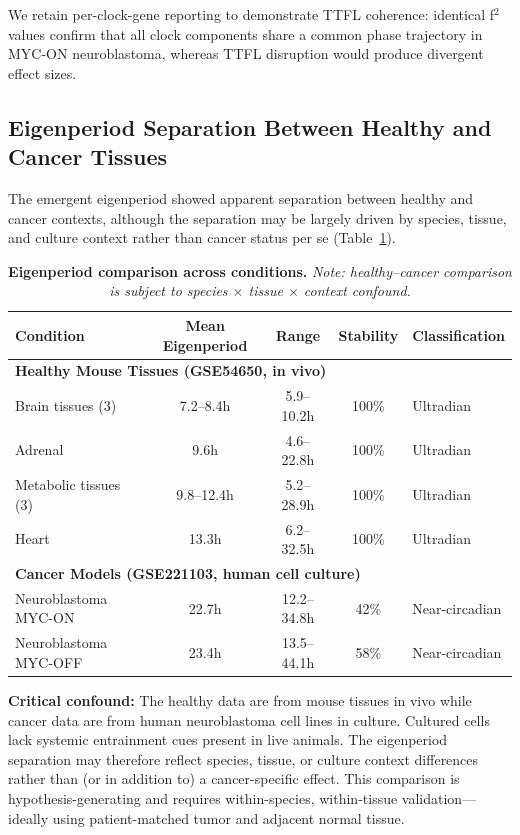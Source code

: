 \documentclass[11pt,letterpaper]{article}
\begin{document}
We retain per-clock-gene reporting to demonstrate TTFL coherence: identical f$^2$ values confirm that all clock components share a common phase trajectory in MYC-ON neuroblastoma, whereas TTFL disruption would produce divergent effect sizes.

\subsection{Eigenperiod Separation Between Healthy and Cancer Tissues}

The emergent eigenperiod showed apparent separation between healthy and cancer contexts, although the separation may be largely driven by species, tissue, and culture context rather than cancer status per se (Table~\ref{tab:eigenperiod}).

\begin{table}[H]
\centering
\caption{\textbf{Eigenperiod comparison across conditions.} \textit{Note: healthy--cancer comparison is subject to species $\times$ tissue $\times$ context confound.}}
\label{tab:eigenperiod}
\begin{tabular}{lcccl}
\toprule
Condition & Mean Eigenperiod & Range & Stability & Classification \\
\midrule
\multicolumn{5}{l}{\textbf{Healthy Mouse Tissues (GSE54650, in vivo)}} \\
Brain tissues (3) & 7.2--8.4h & 5.9--10.2h & 100\% & Ultradian \\
Adrenal & 9.6h & 4.6--22.8h & 100\% & Ultradian \\
Metabolic tissues (3) & 9.8--12.4h & 5.2--28.9h & 100\% & Ultradian \\
Heart & 13.3h & 6.2--32.5h & 100\% & Ultradian \\
\midrule
\multicolumn{5}{l}{\textbf{Cancer Models (GSE221103, human cell culture)}} \\
Neuroblastoma MYC-ON & 22.7h & 12.2--34.8h & 42\% & Near-circadian \\
Neuroblastoma MYC-OFF & 23.4h & 13.5--44.1h & 58\% & Near-circadian \\
\bottomrule
\end{tabular}
\end{table}

\textbf{Critical confound:} The healthy data are from mouse tissues in vivo while cancer data are from human neuroblastoma cell lines in culture. Cultured cells lack systemic entrainment cues present in live animals. The eigenperiod separation may therefore reflect species, tissue, or culture context differences rather than (or in addition to) a cancer-specific effect. This comparison is hypothesis-generating and requires within-species, within-tissue validation---ideally using patient-matched tumor and adjacent normal tissue.
\end{document}
